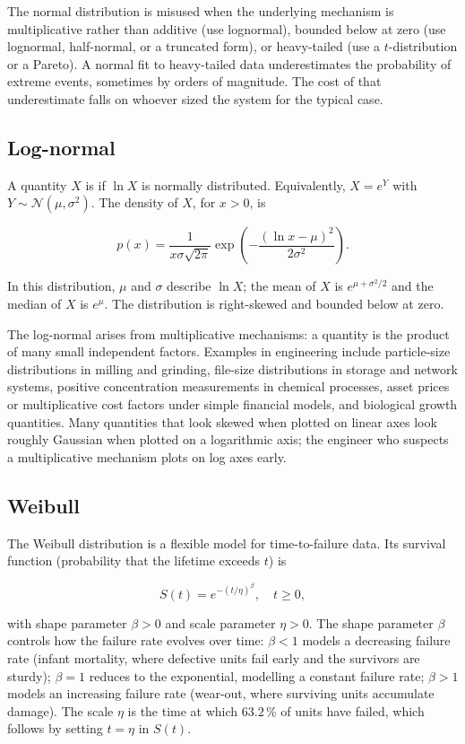 The normal distribution is misused when the underlying mechanism is
multiplicative rather than additive (use lognormal), bounded below
at zero (use lognormal, half-normal, or a truncated form), or
heavy-tailed (use a $t$-distribution or a Pareto). A normal fit to
heavy-tailed data underestimates the probability of extreme events,
sometimes by orders of magnitude. The cost of that underestimate
falls on whoever sized the system for the typical case.

\subsection{Log-normal}

A quantity $X$ is  if $\ln X$ is normally
distributed. Equivalently, $X = e^{Y}$ with $Y \sim \mathcal{N}(\mu,
\sigma^{2})$. The density of $X$, for $x > 0$, is

\[
p(x) = \frac{1}{x \sigma \sqrt{2\pi}}
\exp\!\left(-\frac{(\ln x - \mu)^{2}}{2\sigma^{2}}\right).
\]

In this distribution, $\mu$ and $\sigma$ describe $\ln X$; the mean
of $X$ is $e^{\mu + \sigma^{2}/2}$ and the median of $X$ is $e^{\mu}$.
The distribution is right-skewed and bounded below at zero.

The log-normal arises from multiplicative mechanisms: a quantity is
the product of many small independent factors. Examples in
engineering include particle-size distributions in milling and
grinding, file-size distributions in storage and network systems,
positive concentration measurements in chemical processes, asset
prices or multiplicative cost factors under simple financial
models, and biological growth quantities. Many
quantities that look skewed when plotted on linear axes look
roughly Gaussian when plotted on a logarithmic axis; the engineer
who suspects a multiplicative mechanism plots on log axes early.

\subsection{Weibull}

The Weibull distribution is a flexible model for time-to-failure
data. Its survival function (probability that the lifetime exceeds
$t$) is

\[
S(t) = e^{-(t/\eta)^{\beta}}, \quad t \geq 0,
\]

with shape parameter $\beta > 0$ and scale parameter $\eta > 0$. The
shape parameter $\beta$ controls how the failure rate evolves over
time: $\beta < 1$ models a decreasing failure rate (infant
mortality, where defective units fail early and the survivors are
sturdy); $\beta = 1$ reduces to the exponential, modelling a
constant failure rate; $\beta > 1$ models an increasing failure rate
(wear-out, where surviving units accumulate damage). The scale
$\eta$ is the time at which $63.2 \,\%$ of units have failed, which
follows by setting $t = \eta$ in $S(t)$.

